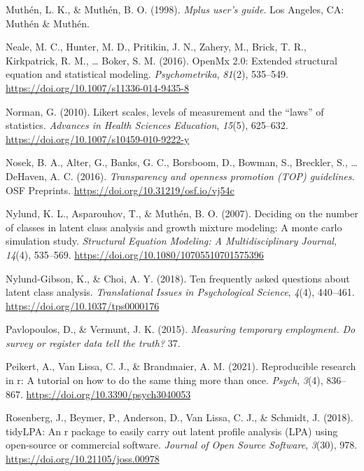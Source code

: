 \documentclass[
  ,man,floatsintext]{apa6}
\newlength{\cslhangindent}
\newlength{\cslentryspacingunit} %
\newenvironment{CSLReferences}[2] %
 {%
  \setlength{\parindent}{0pt}
  \ifodd #1
  \let\oldpar\par
  \def\par{\hangindent=\cslhangindent\oldpar}
  \fi
  \setlength{\parskip}{#2\cslentryspacingunit}
 }%
 {}
\begin{document}
\begin{CSLReferences}{1}{0}
\leavevmode{}%
Muthén, L. K., \& Muthén, B. O. (1998). \emph{Mplus user's guide}. Los Angeles, {CA}: Muthén \& Muthén.

\leavevmode{}%
Neale, M. C., Hunter, M. D., Pritikin, J. N., Zahery, M., Brick, T. R., Kirkpatrick, R. M., \ldots{} Boker, S. M. (2016). {OpenMx} 2.0: Extended structural equation and statistical modeling. \emph{Psychometrika}, \emph{81}(2), 535--549. \url{https://doi.org/10.1007/s11336-014-9435-8}

\leavevmode{}%
Norman, G. (2010). Likert scales, levels of measurement and the {``laws''} of statistics. \emph{Advances in Health Sciences Education}, \emph{15}(5), 625--632. \url{https://doi.org/10.1007/s10459-010-9222-y}

\leavevmode{}%
Nosek, B. A., Alter, G., Banks, G. C., Borsboom, D., Bowman, S., Breckler, S., \ldots{} DeHaven, A. C. (2016). \emph{Transparency and openness promotion ({TOP}) guidelines}. {OSF} Preprints. \url{https://doi.org/10.31219/osf.io/vj54c}

\leavevmode{}%
Nylund, K. L., Asparouhov, T., \& Muthén, B. O. (2007). Deciding on the number of classes in latent class analysis and growth mixture modeling: A monte carlo simulation study. \emph{Structural Equation Modeling: A Multidisciplinary Journal}, \emph{14}(4), 535--569. \url{https://doi.org/10.1080/10705510701575396}

\leavevmode{}%
Nylund-Gibson, K., \& Choi, A. Y. (2018). Ten frequently asked questions about latent class analysis. \emph{Translational Issues in Psychological Science}, \emph{4}(4), 440--461. \url{https://doi.org/10.1037/tps0000176}

\leavevmode{}%
Pavlopoulos, D., \& Vermunt, J. K. (2015). \emph{Measuring temporary employment. Do survey or register data tell the truth?} 37.

\leavevmode{}%
Peikert, A., Van Lissa, C. J., \& Brandmaier, A. M. (2021). Reproducible research in r: A tutorial on how to do the same thing more than once. \emph{Psych}, \emph{3}(4), 836--867. \url{https://doi.org/10.3390/psych3040053}

\leavevmode{}%
Rosenberg, J., Beymer, P., Anderson, D., Van Lissa, C. J., \& Schmidt, J. (2018). {tidyLPA}: An r package to easily carry out latent profile analysis ({LPA}) using open-source or commercial software. \emph{Journal of Open Source Software}, \emph{3}(30), 978. \url{https://doi.org/10.21105/joss.00978}


\end{CSLReferences}
\end{document}
